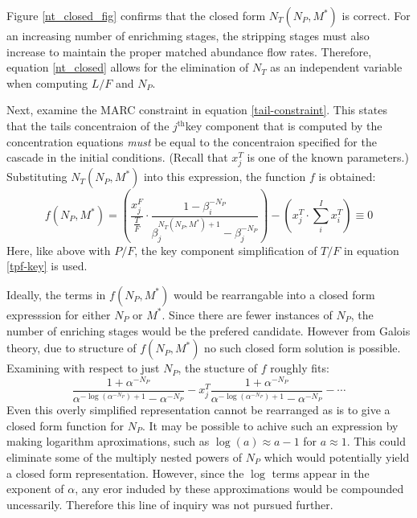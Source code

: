 \documentclass[preprint,12pt]{elsarticle}
\newcommand{\superscript}[1]{\ensuremath{^{\textrm{#1}}}}
\newcommand{\jth}[0]{$j$\superscript{th}}
\begin{document}
Figure \ref{nt_closed_fig} confirms that the closed form $N_T(N_P, M^*)$ is correct.
For an increasing number of enrichming stages, the stripping stages must also 
increase to maintain the proper matched abundance flow rates.
Therefore, equation \ref{nt_closed} allows for the elimination of $N_T$ as an 
independent variable when computing $L/F$ and $N_P$.

Next, examine the MARC constraint in equation \ref{tail-constraint}.  This states that
the tails concentraion of the \jth key component that is computed by the concentration
equations \emph{must} be equal to the concentraion specified for the cascade in the
initial conditions.  (Recall that $x_j^T$ is one of the known parameters.)  
Substituting $N_T(N_P, M^*)$ into this expression, the function $f$ is obtained:
\begin{equation}
f(N_P,M^*) =
\left(\frac{x_j^F}{\frac{T}{F}} \cdot \frac{1 - \beta_i^{-N_P}}
                                           {\beta_j^{N_T(N_P,M^*)+1} - \beta_j^{-N_P}} \right)
- \left(x_j^T\cdot\sum_i^{I} x_i^T\right) \equiv 0
\end{equation}
Here, like above with $P/F$, the key component simplification of $T/F$ in equation
\ref{tpf-key} is used.

Ideally, the terms in $f(N_P,M^*)$ would be rearrangable into a closed form expresssion
for either $N_P$ or $M^*$.  Since there are fewer instances of $N_P$, the number of
enriching stages would be the prefered candidate.  However from Galois theory, 
due to structure of $f(N_P,M^*)$ no such closed form solution is possible.  Examining
with respect to just $N_P$, the stucture of $f$ roughly fits:
\begin{equation}
\frac{1 + \alpha^{-N_P}}{\alpha^{-\log(\alpha^{-N_P})+1} - \alpha^{-N_P}} - x_j^T
    \frac{1 + \alpha^{-N_P}}{\alpha^{-\log(\alpha^{-N_P})+1} - \alpha^{-N_P}} -
    \cdots 
\end{equation}
Even this overly simplified representation cannot be rearranged as is to give a 
closed form function for $N_P$.  It may be possible to achive such an expression 
by making logarithm aproximations, such as $\log(a) \approx a - 1$ for $a\approx1$.  
This could 
eliminate some of the multiply nested powers of $N_P$ which would potentially yield
a closed form representation.  However, since the $\log$ terms appear in the exponent
of $\alpha$, any eror induded by these approximations would be compounded 
uncessarily.  Therefore this line of inquiry was not pursued further.
\end{document}
